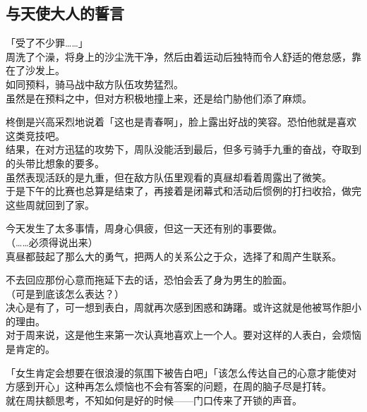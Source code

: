 \subsection{与天使大人的誓言}

「受了不少罪……」\\

周洗了个澡，将身上的沙尘洗干净，然后由着运动后独特而令人舒适的倦怠感，靠在了沙发上。\\

如同预料，骑马战中敌方队伍攻势猛烈。\\

虽然是在预料之中，但对方积极地撞上来，还是给门胁他们添了麻烦。

柊倒是兴高采烈地说着「这也是青春啊」，脸上露出好战的笑容。恐怕他就是喜欢这类竞技吧。\\

结果，在对方迅猛的攻势下，周队没能活到最后，但多亏骑手九重的奋战，夺取到的头带比想象的要多。\\

虽然表现活跃的是九重，但在敌方队伍里观看的真昼却看着周露出了微笑。\\

于是下午的比赛也总算是结束了，再接着是闭幕式和活动后惯例的打扫收拾，做完这些周就回到了家。

今天发生了太多事情，周身心俱疲，但这一天还有别的事要做。\\

（……必须得说出来）\\

真昼都鼓起了那么大的勇气，把两人的关系公之于众，选择了和周产生联系。

不去回应那份心意而拖延下去的话，恐怕会丢了身为男生的脸面。\\

（可是到底该怎么表达？）\\

决心是有了，可一想到表白，周就再次感到困惑和踌躇。或许这就是他被骂作胆小的理由。\\

对于周来说，这是他生来第一次认真地喜欢上一个人。要对这样的人表白，会烦恼是肯定的。

「女生肯定会想要在很浪漫的氛围下被告白吧」「该怎么传达自己的心意才能使对方感到开心」这种再怎么烦恼也不会有答案的问题，在周的脑子尽是打转。\\

就在周扶额思考，不知如何是好的时候——门口传来了开锁的声音。\\

